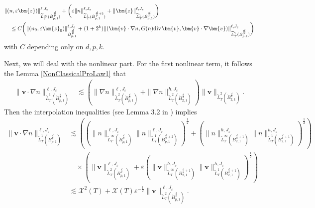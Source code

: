 \documentclass{amsart}
\theoremstyle{definition}
\theoremstyle{remark}
\numberwithin{equation}{section}
\def\dB{{\dot {B}}}
\renewcommand{\div}{\mbox{\rm div}\;\!}
\def\cX{{\mathcal X}}
\def\tL{\widetilde{L}}
\def\bz{{\bm{z} }}
\def\bv{{\bm{v} }}
\begin{document}
\begin{equation}\label{LowEst3}
\begin{split}
&\|(n,\varepsilon \bz)\|_{\tL_T^\infty(\dot B_{p,1}^{\frac{d}{p}})}^{\ell,J_\varepsilon}
+\bigg(\varepsilon\|n\|_{\tL_T^1(\dot B_{p,1}^{\frac{d}{p}+2})}^{\ell,J_\varepsilon}
+\|\bz\|_{\tL_T^1(\dot B_{p,1}^{\frac{d}{p}})}^{\ell,J_\varepsilon}\bigg)\\
&\quad\leq
C\bigg(\|(n_0, \varepsilon \bz_0)\|_{\dot B_{p,1}^{\frac{d}{p}}}^{\ell,J_\varepsilon}
+(1+2^{k})\|(\bv\cdot \nabla n,G(n)\div \bv,\bv\cdot \nabla\bv)\|_{\tL_T^1(\dB_{p,1}^{\frac{d}{p}})}^{\ell,J_\varepsilon}\bigg)
\end{split}
\end{equation}
with $C$ depending only on $d,p,k$.

Next, we will deal with the nonlinear part. For the first nonlinear term, it follows the Lemma \ref{NonClassicalProLaw1} that
\begin{equation*}
\begin{split}
\|\bv\cdot \nabla n\|_{\tL_T^1(\dB_{p,1}^{\frac{d}{p}})}^{\ell,J_\varepsilon}
&\lesssim
\left(
\|\nabla n\|_{\tL_T^2(\dB_{p,1}^{\frac{d}{p}})}^{\ell,J_\varepsilon}
+ \|\nabla n\|_{\tL_T^2(\dB_{2,1}^{\frac{d}{2}})}^{h,J_\varepsilon}
\right)
\|\bv\|_{\tL_T^2(\dB_{2,1}^{\frac{d}{2}})}.
\end{split}
\end{equation*}
Then the interpolation inequalities (see Lemma 3.2 in \cite{XuZhang}) implies
\begin{equation}\label{NL1}
\begin{split}
\|\bv\cdot \nabla n\|_{\tL_T^1(\dB_{p,1}^{\frac{d}{p}})}^{\ell,J_\varepsilon}
&\lesssim
\left(\left(\| n\|_{\tL_T^\infty(\dB_{p,1}^{\frac{d}{p}})}^{\ell,J_\varepsilon}
\|n\|_{\tL_T^1(\dB_{p,1}^{\frac{d}{p}+2})}^{\ell,J_\varepsilon}\right)^{\frac{1}{2}}
+\left(\|n\|_{\tL_T^\infty(\dB_{2,1}^{\frac{d}{2}+1})}^{h,J_\varepsilon}
\|n\|_{\tL_T^1(\dB_{2,1}^{\frac{d}{2}+1})}^{h,J_\varepsilon}\right)^{\frac{1}{2}}
\right)\\
&\quad
\times\left(\|\bv\|_{\tL_T^2(\dB_{p,1}^{\frac{d}{p}})}^{\ell,J_\varepsilon}
+\varepsilon\left(\|\bv\|_{\tL_T^\infty(\dB_{2,1}^{\frac{d}{2}+1})}^{h,J_\varepsilon}
\|\bv\|_{\tL_T^1(\dB_{2,1}^{\frac{d}{2}+1})}^{h,J_\varepsilon}\right)^{\frac{1}{2}}\right)\\
&\lesssim
\cX^2(T)+\cX(T)\varepsilon^{-\frac{1}{2}}\|\bv\|_{\tL_T^2(\dB_{p,1}^{\frac{d}{p}})}^{\ell,J_\varepsilon}.
\end{split}
\end{equation}
\end{document}
